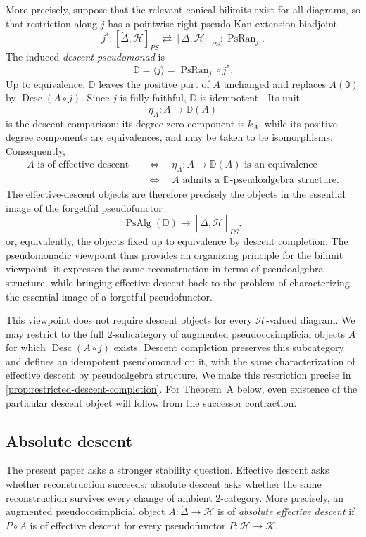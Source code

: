 \documentclass[11pt,a4paper]{article}
\numberwithin{equation}{section}
\theoremstyle{definition}
\theoremstyle{remark}
\newcommand{\Hcat}{\mathcal H}
\newcommand{\Kcat}{\mathcal K}
\newcommand{\PsRan}{\operatorname{PsRan}}
\newcommand{\Desc}{\operatorname{Desc}}
\newcommand{\Dmon}{\mathbb D}
\newcommand{\PsAlg}{\operatorname{PsAlg}}
\begin{document}
More precisely, suppose that the relevant conical bilimits exist for
all diagrams, so that restriction along \(j\) has a pointwise right
pseudo-Kan-extension biadjoint
\[
j^*\colon[\dot\Delta,\Hcat]_{PS}
\rightleftarrows[\Delta,\Hcat]_{PS}:\PsRan_j.
\]
The induced \emph{descent pseudomonad} is
\[
\Dmon=\langle j\rangle=\PsRan_j\circ j^*.
\]
Up to equivalence, \(\Dmon\) leaves the positive part of \(A\)
unchanged and replaces \(A(\mathsf 0)\) by \(\Desc(A\circ j)\). Since \(j\) is fully
faithful, \(\Dmon\) is idempotent
\cite[Theorem~3.30]{Nunes2018}. Its unit
\[
\eta_A\colon A\longrightarrow\Dmon(A)
\]
is the descent comparison: its degree-zero component is \(k_A\), while
its positive-degree components are equivalences, and may be taken to be isomorphisms. Consequently,
\[
\begin{aligned}
	A\text{ is of effective descent}
	&\quad\Longleftrightarrow\quad
	\eta_A\colon A\longrightarrow\Dmon(A)
	\text{ is an equivalence}
	\\
	&\quad\Longleftrightarrow\quad
	A\text{ admits a }\Dmon\text{-pseudoalgebra structure}.
\end{aligned}
\]
The effective-descent objects are therefore precisely the objects in
the essential image of the forgetful pseudofunctor
\[
\PsAlg(\Dmon)\longrightarrow[\dot\Delta,\Hcat]_{PS},
\]
or, equivalently, the objects fixed up to equivalence by descent
completion. The pseudomonadic viewpoint thus provides an organizing
principle for the bilimit viewpoint: it expresses the same
reconstruction in terms of pseudoalgebra structure, while bringing
effective descent back to the problem of characterizing the essential
image of a forgetful pseudofunctor.

This viewpoint does not require descent objects for every
\(\Hcat\)-valued diagram. We may restrict to the full
\(2\)-subcategory of augmented pseudocosimplicial objects \(A\)
for which \(\Desc(A\circ j)\) exists. Descent completion preserves this
subcategory and defines an idempotent pseudomonad on it, with the
same characterization of effective descent by pseudoalgebra
structure. We make this restriction precise in
\cref{prop:restricted-descent-completion}. For Theorem~A below,
even existence of the particular descent object will follow from
the successor contraction.

\subsection*{Absolute descent}

The present paper asks a stronger stability question. Effective
descent asks whether reconstruction succeeds; absolute descent asks
whether the same reconstruction survives every change of ambient
\(2\)-category. More precisely, an augmented pseudocosimplicial
object \(A\colon\dot\Delta\to\Hcat\) is of \textit{absolute effective descent}
if \(P\circ A\) is of effective descent for every pseudofunctor
\(P\colon\Hcat\to\Kcat\).
\end{document}
